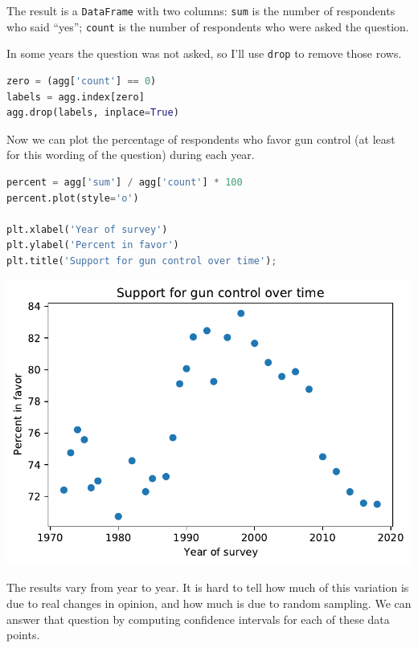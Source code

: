 The result is a \passthrough{\lstinline!DataFrame!} with two columns:
\passthrough{\lstinline!sum!} is the number of respondents who said
``yes''; \passthrough{\lstinline!count!} is the number of respondents
who were asked the question.

In some years the question was not asked, so I'll use
\passthrough{\lstinline!drop!} to remove those rows.

\begin{lstlisting}[language=Python,style=source]
zero = (agg['count'] == 0)
labels = agg.index[zero]
agg.drop(labels, inplace=True)
\end{lstlisting}

Now we can plot the percentage of respondents who favor gun control (at
least for this wording of the question) during each year.

\begin{lstlisting}[language=Python,style=source]
percent = agg['sum'] / agg['count'] * 100
percent.plot(style='o')

plt.xlabel('Year of survey')
plt.ylabel('Percent in favor')
plt.title('Support for gun control over time');
\end{lstlisting}

\begin{center}
\includegraphics[scale=0.75]{11_resampling_files/11_resampling_94_0.pdf}
\end{center}

The results vary from year to year. It is hard to tell how much of this
variation is due to real changes in opinion, and how much is due to
random sampling. We can answer that question by computing confidence
intervals for each of these data points.


